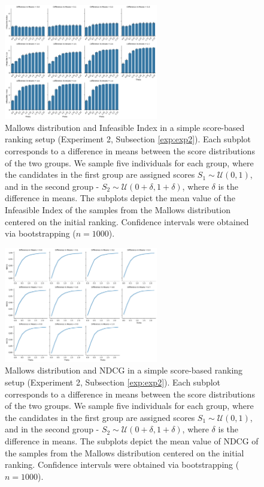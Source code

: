 \begin{figure}[hp]
  \centering
  \includegraphics[width=0.6\textwidth]{resources/EXP2_ii_means.png}
  \caption{Mallows distribution and Infeasible Index in a simple score-based ranking setup (Experiment 2, Subsection \ref{exp:exp2}). Each subplot corresponds to a difference in means between the score distributions of the two groups.  We sample five individuals for each group, where the candidates in the first group are assigned scores $S_1 \sim \mathcal{U}(0,1)$, and in the second group - $S_2 \sim \mathcal{U}(0 + \delta, 1 + \delta)$, where $\delta$ is the difference in means. The subplots depict the mean value of the Infeasible Index of the samples from the Mallows distribution centered on the initial ranking. Confidence intervals were obtained via bootstrapping ($n=1000$).}
  \label{plot:experiment2infind}
\end{figure}

\begin{figure}[hp]
  \centering
  \includegraphics[width=0.6\textwidth]{resources/EXP2_ndcg.png}
  \caption{Mallows distribution and NDCG in a simple score-based ranking setup  (Experiment 2, Subsection \ref{exp:exp2}). Each subplot corresponds to a difference in means between the score distributions of the two groups. We sample five individuals for each group, where the candidates in the first group are assigned scores $S_1 \sim \mathcal{U}(0,1)$, and in the second group - $S_2 \sim \mathcal{U}(0 + \delta, 1 + \delta)$, where $\delta$ is the difference in means. The subplots depict the mean value of NDCG of the samples from the Mallows distribution centered on the initial ranking. Confidence intervals were obtained via bootstrapping ($n=1000$).}
  \label{plot:experiment2ndcg}
\end{figure}


